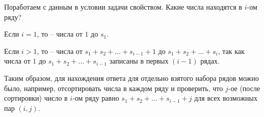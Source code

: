 \solutionSection

Поработаем с данным в условии задачи свойством. Какие числа находятся в $i$-ом ряду?

Если $i = 1$, то -- числа от $1$ до $s_{1}$.

Если $i > 1$, то -- числа от $s_{1} + s_{2} + \ldots + s_{i - 1} + 1$ до $s_{1} + s_{2} + \ldots + s_{i}$, так как числа от $1$ до $s_{1} + s_{2} + \ldots + s_{i - 1}$ записаны в первых $(i - 1)$ рядах.

Таким образом, для нахождения ответа для отдельно взятого набора рядов можно было, например, отсортировать числа в каждом ряду и проверить, что $j$-ое (после сортировки) число в $i$-ом ряду равно $s_{1} + s_{2} + \ldots + s_{i - 1} + j$ для всех возможных пар $(i, j)$.

\codeExample

